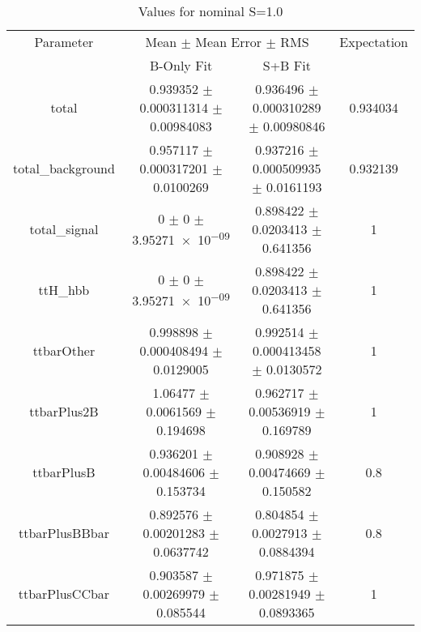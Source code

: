 \begin{table}
\centering
\caption{Values for nominal S=1.0}
\begin{tabular}{cccc}
\toprule
Parameter & \multicolumn{2}{c}{Mean $\pm$ Mean Error $\pm$ RMS} & Expectation\\
 & B-Only Fit & S+B Fit & \\
\midrule
total & \num{0.939352} $\pm$ \num{0.000311314} $\pm$ \num{0.00984083} & \num{0.936496} $\pm$ \num{0.000310289} $\pm$ \num{0.00980846} & \num{0.934034}\\
total\_background & \num{0.957117} $\pm$ \num{0.000317201} $\pm$ \num{0.0100269} & \num{0.937216} $\pm$ \num{0.000509935} $\pm$ \num{0.0161193} & \num{0.932139}\\
total\_signal & \num{0} $\pm$ \num{0} $\pm$ \num{3.95271e-09} & \num{0.898422} $\pm$ \num{0.0203413} $\pm$ \num{0.641356} & \num{1}\\
ttH\_hbb & \num{0} $\pm$ \num{0} $\pm$ \num{3.95271e-09} & \num{0.898422} $\pm$ \num{0.0203413} $\pm$ \num{0.641356} & \num{1}\\
ttbarOther & \num{0.998898} $\pm$ \num{0.000408494} $\pm$ \num{0.0129005} & \num{0.992514} $\pm$ \num{0.000413458} $\pm$ \num{0.0130572} & \num{1}\\
ttbarPlus2B & \num{1.06477} $\pm$ \num{0.0061569} $\pm$ \num{0.194698} & \num{0.962717} $\pm$ \num{0.00536919} $\pm$ \num{0.169789} & \num{1}\\
ttbarPlusB & \num{0.936201} $\pm$ \num{0.00484606} $\pm$ \num{0.153734} & \num{0.908928} $\pm$ \num{0.00474669} $\pm$ \num{0.150582} & \num{0.8}\\
ttbarPlusBBbar & \num{0.892576} $\pm$ \num{0.00201283} $\pm$ \num{0.0637742} & \num{0.804854} $\pm$ \num{0.0027913} $\pm$ \num{0.0884394} & \num{0.8}\\
ttbarPlusCCbar & \num{0.903587} $\pm$ \num{0.00269979} $\pm$ \num{0.085544} & \num{0.971875} $\pm$ \num{0.00281949} $\pm$ \num{0.0893365} & \num{1}\\
\bottomrule
\end{tabular}
\end{table}